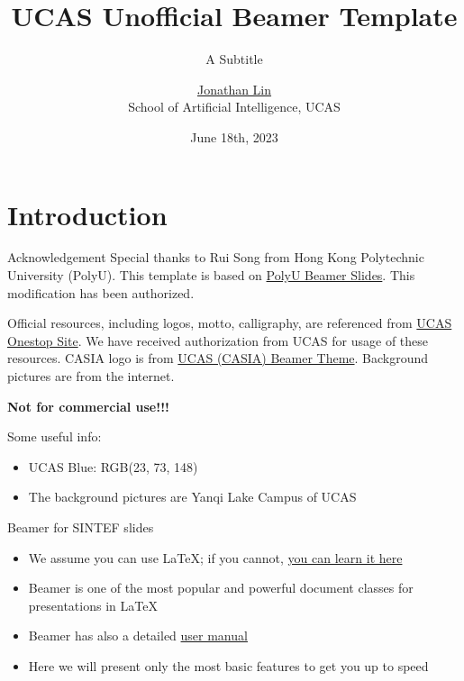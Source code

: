 \documentclass[10pt,aspectratio=169]{beamer}
\title{UCAS Unofficial Beamer Template}
\subtitle{A Subtitle}
\author{\href{mailto:linchenghao21@mails.ucas.ac.cn}{Jonathan Lin}
\\ 
School of Artificial Intelligence, UCAS
}
\date{June 18th, 2023}
\begin{document}
\maketitle

\section{Introduction}

\begin{frame}{Acknowledgement}
    Special thanks to Rui Song from Hong Kong Polytechnic University (PolyU). 
    This template is based on \href{https://github.com/wurahara/PolyU-Beamer-Slides}{PolyU Beamer Slides}. This modification has been authorized. 
    
    Official resources, including logos, motto, calligraphy, are referenced from \href{https://onestop.ucas.edu.cn/home/info/6b9e95dc-5785-4eee-b25f-1f884698cfc3}{UCAS Onestop Site}. We have received authorization from UCAS for usage of these resources. 
    CASIA logo is from \href{https://www.overleaf.com/latex/templates/ucas-casia-beamer-theme/stdydfhvkctw}{UCAS (CASIA) Beamer Theme}. 
    Background pictures are from the internet. 

    \textbf{Not for commercial use!!!}

    Some useful info: 
    \begin{itemize}
        \item UCAS Blue: RGB(23, 73, 148)
        \item The background pictures are Yanqi Lake Campus of UCAS
    \end{itemize}
\end{frame}

\begin{frame}{Beamer for SINTEF slides}{\thesection \, \secname}
\begin{itemize}
\item We assume you can use \LaTeX; if you cannot,
\href{http://en.wikibooks.org/wiki/LaTeX/}{you can learn it here}
\item Beamer is one of the most popular and powerful document
classes for presentations in \LaTeX
\item Beamer has also a detailed
\href{http://www.ctan.org/tex-archive/macros/latex/contrib/beamer/doc/beameruserguide.pdf}{user manual}
\item Here we will present only the most basic features to get you up to speed
\end{itemize}
\end{frame}
\end{document}
